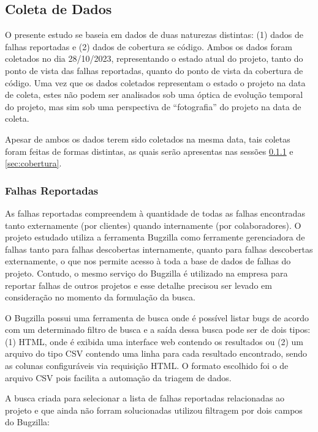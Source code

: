 \documentclass[11.5pt]{article}
\begin{document}

\subsection{Coleta de Dados}

O presente estudo se baseia em dados de duas naturezas distintas: (1) dados de falhas reportadas e
(2) dados de cobertura se código.
Ambos os dados foram coletados no dia 28/10/2023, representando o estado atual do projeto, tanto
do ponto de vista das falhas reportadas, quanto do ponto de vista da cobertura de código.
Uma vez que os dados coletados representam o estado o projeto na data de coleta, estes não podem
ser analisados sob uma óptica de evolução temporal do projeto, mas sim sob uma perspectiva de
``fotografia'' do projeto na data de coleta.

Apesar de ambos os dados terem sido coletados na mesma data, tais coletas foram feitas de formas
distintas, as quais serão apresentas nas sessões \ref{sec:falhasReportadas} e \ref{sec:cobertura}.

\subsubsection{Falhas Reportadas} \label{sec:falhasReportadas}

As falhas reportadas compreendem à quantidade de todas as falhas encontradas tanto externamente
(por clientes) quando internamente (por colaboradores).
O projeto estudado utiliza a ferramenta Bugzilla como ferramente gerenciadora de falhas tanto para
falhas descobertas internamente, quanto para falhas descobertas externamente, o que nos permite
acesso à toda a base de dados de falhas do projeto.
Contudo, o mesmo serviço do Bugzilla é utilizado na empresa para reportar falhas de outros projetos
e esse detalhe precisou ser levado em consideração no momento da formulação da busca.

O Bugzilla possui uma ferramenta de busca onde é possível listar bugs de acordo com um determinado
filtro de busca e a saída dessa busca pode ser de dois tipos: (1) HTML, onde é exibida uma interface
web contendo os resultados ou
(2) um arquivo do tipo CSV contendo uma linha para cada resultado encontrado, sendo as colunas
configuráveis via requisição HTML.
O formato escolhido foi o de arquivo CSV pois facilita a automação da triagem de dados.

A busca criada para selecionar a lista de falhas reportadas relacionadas ao projeto e que ainda não
forram solucionadas utilizou filtragem por dois campos do Bugzilla:
\end{document}
